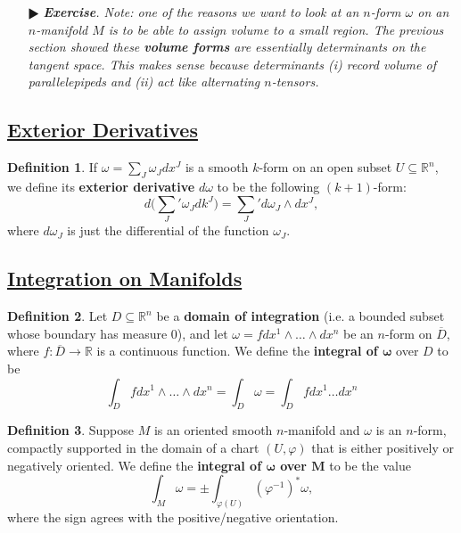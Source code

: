 \documentclass[11pt]{amsart}
\theoremstyle{definition}
\newtheorem*{definition*}{Definition}
\renewcommand\:{\colon}
\renewcommand\bar[1]{\overline{#1}}
\newcommand{\R}{\mathds{R}}
\newcommand{\1}{\mathds{1}}
\newcommand{\exc}[1]{\vspace{-2.5pt}\begin{itemize}[leftmargin=15pt]\item[$\RHD$] \textit{\textbf{Exercise}. #1}\end{itemize}}
\begin{document}
\exc{Note: one of the reasons we want to look at an $n$-form $\omega$ on an $n$-manifold $M$ is to be able to assign volume to a small region. The previous section showed these \textbf{volume forms} are essentially determinants on the tangent space. This makes sense because determinants (i) record volume of parallelepipeds and (ii) act like alternating $n$-tensors.}

\vskip20pt



\subsection*{\underline{Exterior Derivatives}}

\begin{definition*}
	If $\omega = \sum_J \omega_J dx^J$ is a smooth $k$-form on an open subset $U \subseteq \R^n$, we define its \textbf{exterior derivative} $d\omega$ to be the following $(k + 1)$-form:
		\[ d\bigg( \sum_J' \omega_Jdk^J \bigg) = \sum_J' d\omega_J \wedge dx^J, \]
	where $d\omega_J$ is just the differential of the function $\omega_J$.
\end{definition*}

\vskip20pt



\subsection*{\underline{Integration on Manifolds}}

\begin{definition*}
	Let $D \subseteq \R^n$ be a \textbf{domain of integration} (i.e. a bounded subset whose boundary has measure 0), and let $\omega = f dx^1 \wedge \dots \wedge dx^n$ be an $n$-form on $\bar D$, where $f\: \bar D \to \R$ is a continuous function. We define the \textbf{integral of $\boldsymbol{\omega}$} over $D$ to be
		\[ \int_D f dx^1 \wedge \dots \wedge dx^n =  \int_D \omega = \int_D f dx^1 \dots dx^n \]
\end{definition*}

\begin{definition*}
	Suppose $M$ is an oriented smooth $n$-manifold and $\omega$ is an $n$-form, compactly supported in the domain of a chart $(U, \varphi)$ that is either positively or negatively oriented. We define the \textbf{integral of $\boldsymbol{\omega}$ over $\boldsymbol{M}$} to be the value
		\[ \int_M \omega = \pm \int_{\varphi(U)} (\varphi^{-1})^* \omega, \]
	where the sign agrees with the positive/negative orientation.
\end{definition*}
\end{document}
